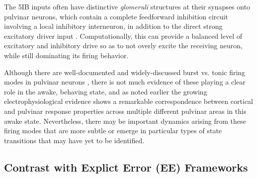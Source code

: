 \documentclass[11pt,twoside]{article}
\newif\myifpdf
\begin{document}
The 5IB inputs often have distinctive \emph{glomeruli} structures at their synapses onto pulvinar neurons, which contain a complete feedforward inhibition circuit involving a local inhibitory interneuron, in addition to the direct strong excitatory driver input \citep{WilsonBoseShermanEtAl84}.  Computationally, this can provide a balanced level of excitatory and inhibitory drive so as to not overly excite the receiving neuron, while still dominating its firing behavior.

Although there are well-documented and widely-discussed burst vs. tonic firing modes in pulvinar neurons \citep{ShermanGuillery06}, there is not much evidence of these playing a clear role in the awake, behaving state, and as noted earlier the growing electrophysiological evidence shows a remarkable correspondence between cortical and pulvinar response properties across multiple different pulvinar areas in this awake state.  Nevertheless, there may be important dynamics arising from these firing modes that are more subtle or emerge in particular types of state transitions that may have yet to be identified.

\subsection{Contrast with Explict Error (EE) Frameworks}
\end{document}
